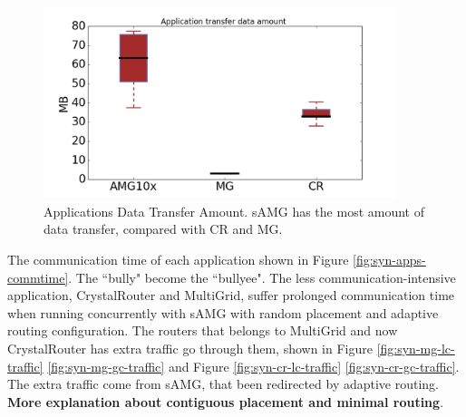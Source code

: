 \documentclass[conference,compsoc]{IEEEtran}
\begin{document}
\begin{figure}[t!]
  \centering
  \includegraphics[height=2.2in]{syn-wkld/data_amount}
  \caption{Applications Data Transfer Amount. sAMG has the most amount of data transfer, compared with CR and MG.}
  \label{fig:syn-3app-data-amount}
\end{figure}

The communication time of each application shown in Figure \ref{fig:syn-apps-commtime}. The ``bully" become the ``bullyee". The less communication-intensive application, CrystalRouter and MultiGrid, suffer prolonged communication time when running concurrently with sAMG with random placement and adaptive routing configuration. The routers that belongs to MultiGrid  and now CrystalRouter has extra traffic go through them, shown in Figure  \ref{fig:syn-mg-lc-traffic} \ref{fig:syn-mg-gc-traffic} and Figure \ref{fig:syn-cr-lc-traffic} \ref{fig:syn-cr-gc-traffic}. The extra traffic come from sAMG, that been redirected by adaptive routing. \textbf{More explanation about contiguous placement and minimal routing}.
\end{document}
